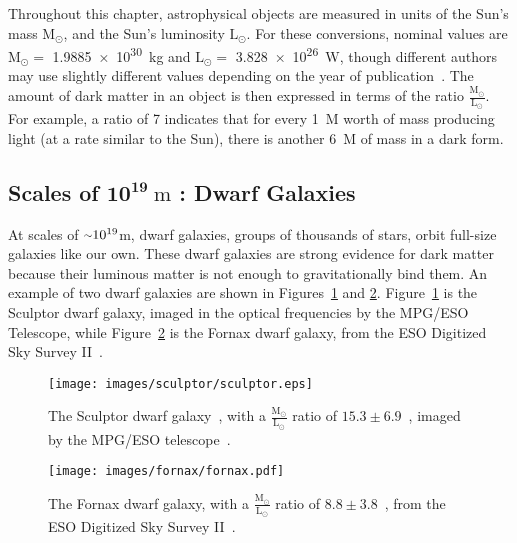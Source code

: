 Throughout this chapter, astrophysical objects are measured in units of the Sun's mass $\textrm{M}_\odot$, and the Sun's luminosity $\textrm{L}_\odot$.
For these conversions, nominal values are $\textrm{M}_\odot =$ \SI{1.9885e30}{kg} and $\textrm{L}_\odot =$ \SI{3.828e26}{W}, though different authors may use slightly different values depending on the year of publication~\cite{iau_solarconstants}.
The amount of dark matter in an object is then expressed in terms of the ratio $\frac{\textrm{M}_\odot}{\textrm{L}_\odot}$.
For example, a ratio of \SI{7}{} indicates that for every \SI{1}{M_\odot} worth of mass producing light (at a rate similar to the Sun), there is another \SI{6}{M_\odot} of mass in a dark form.
  
\subsection[Scales of $10^{19}\:\text{m}$ : Dwarf Galaxies]{Scales of $\mathbf{10^{19}}\:\text{m}$ : Dwarf Galaxies}\label{dm_dwarfscale}
At scales of $\nicetilde 10^{19}$m, dwarf galaxies, groups of thousands of stars, orbit full-size galaxies like our own.
These dwarf galaxies are strong evidence for dark matter because their luminous matter is not enough to gravitationally bind them.
An example of two dwarf galaxies are shown in Figures~\ref{fig:sculptor} and \ref{fig:fornax}.
Figure~\ref{fig:sculptor} is the Sculptor dwarf galaxy, imaged in the optical frequencies by the MPG/ESO Telescope, while Figure~\ref{fig:fornax} is the Fornax dwarf galaxy, from the ESO Digitized Sky Survey II~\cite{fornax_image}.

\begin{figure}[bt]
  \centering
  \texttt{[image: images/sculptor/sculptor.eps]}
  \caption[Sculptor Dwarf Galaxy]{
    The Sculptor dwarf galaxy~\cite{sculptor_image}, with a $\frac{\textrm{M}_\odot}{\textrm{L}_\odot}$ ratio of $15.3\pm6.9$~\cite{sculptor_ml}, imaged by the MPG/ESO telescope~\cite{sculptor_paper}.
  }
  \label{fig:sculptor}
\end{figure}

\begin{figure}[tb]
  \centering
  \texttt{[image: images/fornax/fornax.pdf]}
  \caption[Fornax Dwarf Galaxy]{
    The Fornax dwarf galaxy, with a $\frac{\textrm{M}_\odot}{\textrm{L}_\odot}$ ratio of $8.8\pm3.8$~\cite{sculptor_ml}, from the ESO Digitized Sky Survey II~\cite{fornax_image}.
  }
  \label{fig:fornax}
\end{figure}

